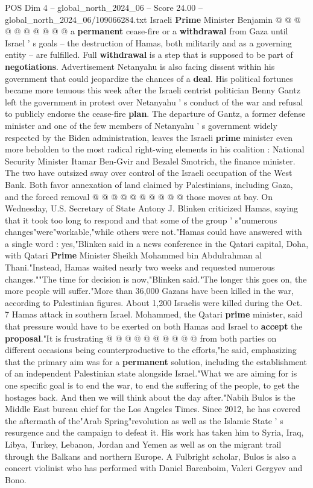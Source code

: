 \begin{textsample}{POS Dim 4 – global\_north\_2024\_06 – Score 24.00 – global\_north\_2024\_06/109066284.txt}
Israeli \textbf{Prime} Minister Benjamin @ @ @ @ @ @ @ @ @ @ a \textbf{permanent} cease-fire or a \textbf{withdrawal} from Gaza until Israel ' s goals -- the destruction of Hamas, both militarily and as a governing entity -- are fulfilled.
Full \textbf{withdrawal} is a step that is supposed to be part of \textbf{negotiations}.
Advertisement Netanyahu is also facing dissent within his government that could jeopardize the chances of a \textbf{deal}.
His political fortunes became more tenuous this week after the Israeli centrist politician Benny Gantz left the government in protest over Netanyahu ' s conduct of the war and refusal to publicly endorse the cease-fire \textbf{plan}.
The departure of Gantz, a former defense minister and one of the few members of Netanyahu ' s government widely respected by the Biden administration, leaves the Israeli \textbf{prime} minister even more beholden to the most radical right-wing elements in his coalition : National Security Minister Itamar Ben-Gvir and Bezalel Smotrich, the finance minister.
The two have outsized sway over control of the Israeli occupation of the West Bank.
Both favor annexation of land claimed by Palestinians, including Gaza, and the forced removal @ @ @ @ @ @ @ @ @ @ those moves at bay.
On Wednesday, U.S.
Secretary of State Antony J.
Blinken criticized Hamas, saying that it took too long to respond and that some of the group ' s"numerous changes"were"workable,"while others were not."Hamas could have answered with a single word : yes,"Blinken said in a news conference in the Qatari capital, Doha, with Qatari \textbf{Prime} Minister Sheikh Mohammed bin Abdulrahman al Thani."Instead, Hamas waited nearly two weeks and requested numerous changes.""The time for decision is now,"Blinken said."The longer this goes on, the more people will suffer."More than 36,000 Gazans have been killed in the war, according to Palestinian figures.
About 1,200 Israelis were killed during the Oct. 7 Hamas attack in southern Israel.
Mohammed, the Qatari \textbf{prime} minister, said that pressure would have to be exerted on both Hamas and Israel to \textbf{accept} the \textbf{proposal}."It is frustrating @ @ @ @ @ @ @ @ @ @ from both parties on different occasions being counterproductive to the efforts,"he said, emphasizing that the primary aim was for a \textbf{permanent} solution, including the establishment of an independent Palestinian state alongside Israel."What we are aiming for is one specific goal is to end the war, to end the suffering of the people, to get the hostages back.
And then we will think about the day after."Nabih Bulos is the Middle East bureau chief for the Los Angeles Times.
Since 2012, he has covered the aftermath of the"Arab Spring"revolution as well as the Islamic State ' s resurgence and the campaign to defeat it.
His work has taken him to Syria, Iraq, Libya, Turkey, Lebanon, Jordan and Yemen as well as on the migrant trail through the Balkans and northern Europe.
A Fulbright scholar, Bulos is also a concert violinist who has performed with Daniel Barenboim, Valeri Gergyev and Bono.


\end{textsample}
